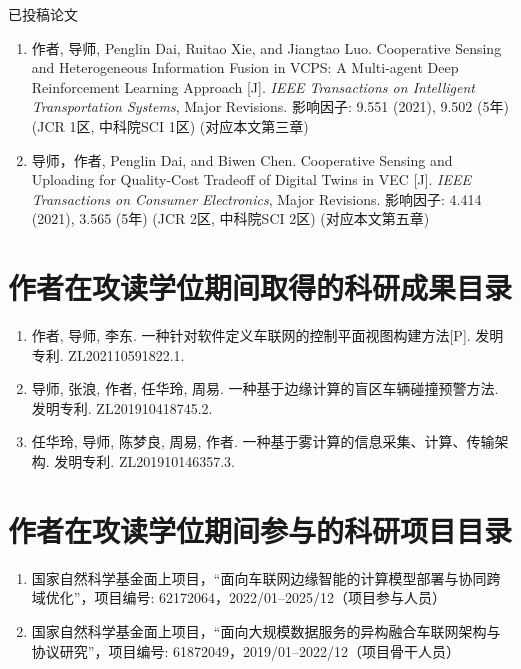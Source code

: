 已投稿论文

\begin{enumerate}
	\item 作者\textbf{}, 导师, Penglin Dai, Ruitao Xie, and Jiangtao Luo. Cooperative Sensing and Heterogeneous Information Fusion in VCPS: A Multi-agent Deep Reinforcement Learning Approach [J]. \textit{IEEE Transactions on Intelligent Transportation Systems}, Major Revisions. 影响因子: 9.551 (2021), 9.502 (5年) (JCR 1区, 中科院SCI 1区) (对应本文第三章)
	\item 导师，作者\textbf{}, Penglin Dai, and Biwen Chen. Cooperative Sensing and Uploading for Quality-Cost Tradeoff of Digital Twins in VEC [J]. \textit{IEEE Transactions on Consumer Electronics}, Major Revisions. 影响因子: 4.414 (2021), 3.565 (5年) (JCR 2区, 中科院SCI 2区) (对应本文第五章) 
\end{enumerate}

\section{作者在攻读学位期间取得的科研成果目录}
\begin{enumerate}
	\item 作者\textbf{}, 导师, 李东. 一种针对软件定义车联网的控制平面视图构建方法[P]. 发明专利. ZL202110591822.1.
	\item 导师, 张浪, 作者\textbf{}, 任华玲, 周易. 一种基于边缘计算的盲区车辆碰撞预警方法. 发明专利. ZL201910418745.2.
	\item 任华玲, 导师, 陈梦良, 周易, 作者\textbf{}. 一种基于雾计算的信息采集、计算、传输架构. 发明专利. ZL201910146357.3.
\end{enumerate}

\section{作者在攻读学位期间参与的科研项目目录}
\begin{enumerate}
	\item 国家自然科学基金面上项目，“面向车联网边缘智能的计算模型部署与协同跨域优化”，项目编号: 62172064，2022/01–2025/12（项目参与人员）
	\item 国家自然科学基金面上项目，“面向大规模数据服务的异构融合车联网架构与协议研究”，项目编号: 61872049，2019/01–2022/12（项目骨干人员）
\end{enumerate}

